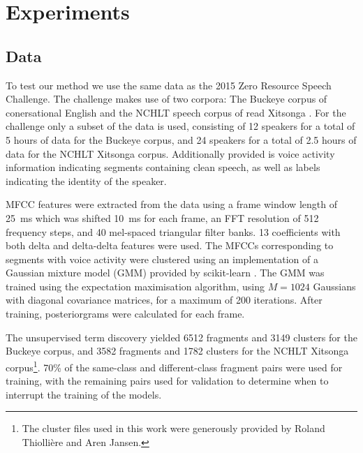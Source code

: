 \section{Experiments}
\label{sec:experiments}

\subsection{Data}
\label{sec:data}

To test our method we use the same data as the 2015 Zero Resource Speech Challenge.
The challenge makes use of two corpora: The Buckeye corpus of conersational English \parencite{buckeyecorpus} and the NCHLT speech corpus of read Xitsonga \parencite{barnard2014nchlt}.
For the challenge only a subset of the data is used, consisting of 12 speakers for a total of 5 hours of data for the Buckeye corpus, and 24 speakers for a total of 2.5 hours of data for the NCHLT Xitsonga corpus.
Additionally provided is voice activity information indicating segments containing clean speech, as well as labels indicating the identity of the speaker.

MFCC features were extracted from the data using a frame window length of \SI{25}{\ms} which was shifted \SI{10}{\ms} for each frame, an FFT resolution of 512 frequency steps, and 40 mel-spaced triangular filter banks.
13 coefficients with both delta and delta-delta features were used.
The MFCCs corresponding to segments with voice activity were clustered using an implementation of a Gaussian mixture model (GMM) provided by scikit-learn \parencite{scikit-learn}.
The GMM was trained using the expectation maximisation algorithm, using $M = 1024$ Gaussians with diagonal covariance matrices, for a maximum of 200 iterations.
After training, posteriorgrams were calculated for each frame.

The unsupervised term discovery yielded 6512 fragments and 3149 clusters for the Buckeye corpus, and 3582 fragments and 1782 clusters for the NCHLT Xitsonga corpus\footnote{The cluster files used in this work were generously provided by Roland Thiollière and Aren Jansen.}.
70\% of the same-class and different-class fragment pairs were used for training, with the remaining pairs used for validation to determine when to interrupt the training of the models.


